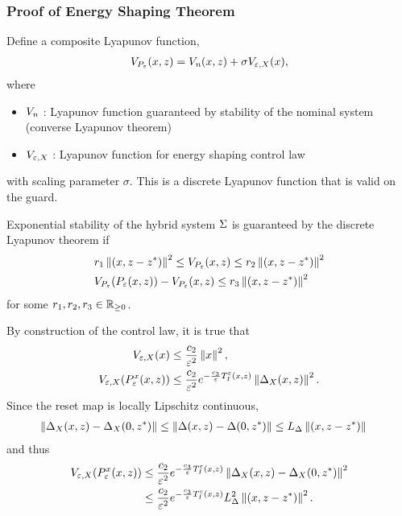 \begin{frame}[t]
  \frametitle{Proof of Energy Shaping Theorem}
   {
    Define a composite Lyapunov function,
    \begin{align*}
      V_{P_{\varepsilon}}(x, z) = V_{\mathit{n}}(x, z) + \sigma V_{\varepsilon, X}(x),
    \end{align*}
    where
    \begin{itemize}
    \item $V_{\mathit{n}}$ : Lyapunov function guaranteed by stability of the nominal system
      (converse Lyapunov theorem)
    \item $V_{\varepsilon, X}$ : Lyapunov function for energy shaping control law
    \end{itemize}
    with scaling parameter $\sigma$. This is a discrete Lyapunov function that
    is valid on the guard.
  }
  
   {
    Exponential stability of the hybrid system $\Sigma$ is guaranteed by the
    discrete Lyapunov theorem if
    \begin{eqnarray*}
      &r_{1} \left\|(x, z - z^{*})\right\|^{2} \leq V_{P_{\varepsilon}}(x, z) \leq r_{2} \left\|(x, z - z^{*})\right\|^{2}\\
      &V_{P_{\varepsilon}}(P_{\varepsilon}(x, z)) - V_{P_{\varepsilon}}(x, z) \leq r_{3} \left\|(x, z - z^{*})\right\|^{2}
    \end{eqnarray*}
    for some $r_{1}, r_{2}, r_{3} \in \mathbb{R}_{\geq 0}$.
  }

   {
    By construction of the control law, it is true that
    \begin{align*}
      V_{\varepsilon, X}(x) &\leq \frac{c_{2}}{\varepsilon^{2}} \left\| x
      \right\|^{2},\\
      V_{\varepsilon, X}(P_{\varepsilon}^{x}(x, z)) &\leq \frac{c_{2}}{\varepsilon^{2}}
      e^{-\frac{c_{3}}{\varepsilon} T_{I}^{\varepsilon}(x, z)} \left\| \Delta_{X}(x, z) \right\|^{2}.
    \end{align*}
    Since the reset map is locally Lipschitz continuous,
    \begin{align*}
      \left\| \Delta_{X}(x, z) - \Delta_{X}(0, z^{*}) \right\| &\leq \left\| \Delta(x, z)
        - \Delta(0, z^{*}) \right\|
      \leq L_{\Delta} \left\|(x, z - z^{*})\right\|
    \end{align*}
    and thus
    \begin{align*}
      V_{\varepsilon, X}(P_{\varepsilon}^{x}(x, z)) &\leq \frac{c_{2}}{\varepsilon^{2}}
      e^{-\frac{c_{3}}{\varepsilon} T_{I}^{\varepsilon}(x, z)} \left\| \Delta_{X}(x, z) -
        \Delta_{X}(0, z^{*}) \right\|^{2}\\
      &\leq \frac{c_{2}}{\varepsilon^{2}} e^{-\frac{c_{3}}{\varepsilon}
        T_{I}^{\varepsilon}(x, z)} L_{\Delta}^{2} \left\|(x, z - z^{*})\right\|^{2}.
    \end{align*}
  }


\end{frame}
